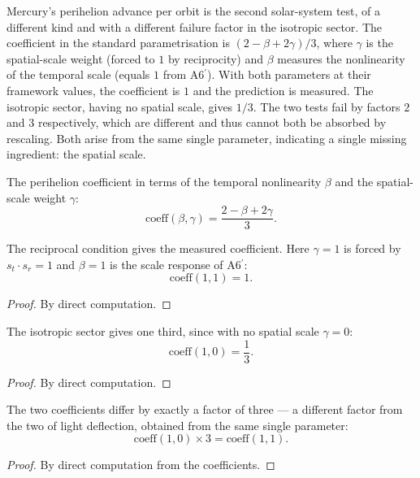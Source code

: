 Mercury's perihelion advance per orbit is the second solar-system test, of a different kind and with a different failure factor in the isotropic sector. The coefficient in the standard parametrisation is $(2 - \beta + 2\gamma)/3$, where $\gamma$ is the spatial-scale weight (forced to $1$ by reciprocity) and $\beta$ measures the nonlinearity of the temporal scale (equals $1$ from A6$^\prime$). With both parameters at their framework values, the coefficient is $1$ and the prediction is measured. The isotropic sector, having no spatial scale, gives $1/3$. The two tests fail by factors $2$ and $3$ respectively, which are different and thus cannot both be absorbed by rescaling. Both arise from the same single parameter, indicating a single missing ingredient: the spatial scale.

\begin{definition}
The perihelion coefficient in terms of the temporal nonlinearity $\beta$ and the spatial-scale weight $\gamma$:
\[
\text{coeff}(\beta, \gamma) = \frac{2 - \beta + 2\gamma}{3}.
\]
\end{definition}

\begin{theorem}
The reciprocal condition gives the measured coefficient. Here $\gamma = 1$ is forced by $s_t \cdot s_r = 1$ and $\beta = 1$ is the scale response of A6$^\prime$:
\[
\text{coeff}(1, 1) = 1.
\]
\begin{proof}
By direct computation.
\end{proof}
\end{theorem}

\begin{theorem}
The isotropic sector gives one third, since with no spatial scale $\gamma = 0$:
\[
\text{coeff}(1, 0) = \frac{1}{3}.
\]
\begin{proof}
By direct computation.
\end{proof}
\end{theorem}

\begin{theorem}
The two coefficients differ by exactly a factor of three — a different factor from the two of light deflection, obtained from the same single parameter:
\[
\text{coeff}(1, 0) \times 3 = \text{coeff}(1, 1).
\]
\begin{proof}
By direct computation from the coefficients.
\end{proof}
\end{theorem}

